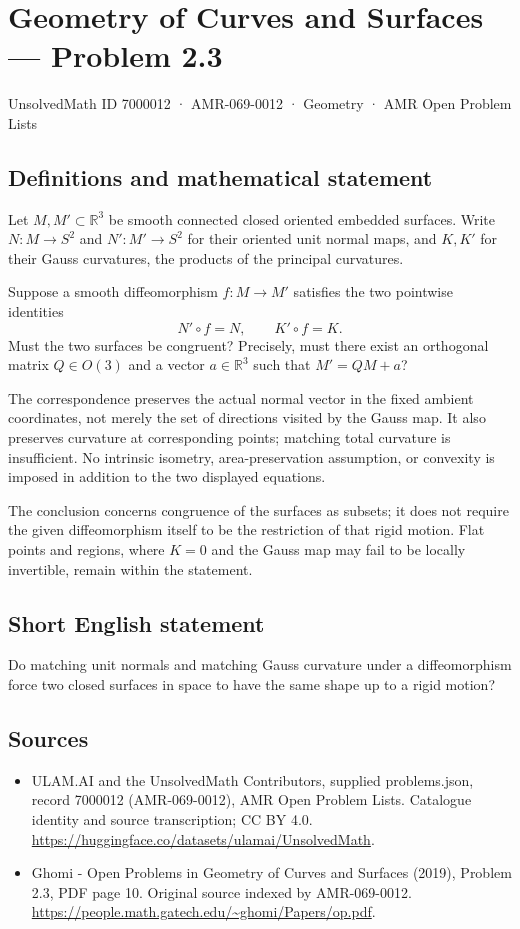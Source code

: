 \documentclass[11pt,a4paper]{article}
\begin{document}
\section*{Geometry of Curves and Surfaces — Problem 2.3}\label{7000012}
{\small UnsolvedMath ID 7000012 · AMR-069-0012 · Geometry · AMR Open Problem Lists}
\subsection{Definitions and mathematical statement}
Let $M,M'\subset\mathbb R^3$ be smooth connected closed oriented
embedded surfaces. Write $N:M\to S^2$ and $N':M'\to S^2$ for
their oriented unit normal maps, and $K,K'$ for their Gauss
curvatures, the products of the principal curvatures.

Suppose a smooth diffeomorphism $f:M\to M'$ satisfies the two
pointwise identities
\[
                         N'\circ f=N,\qquad K'\circ f=K.
\]
Must the two surfaces be congruent? Precisely, must there exist
an orthogonal matrix $Q\in O(3)$ and a vector $a\in\mathbb R^3$
such that $M'=QM+a$?

The correspondence preserves the actual normal vector in the
fixed ambient coordinates, not merely the set of directions
visited by the Gauss map. It also preserves curvature at
corresponding points; matching total curvature is insufficient.
No intrinsic isometry, area-preservation assumption, or convexity
is imposed in addition to the two displayed equations.

The conclusion concerns congruence of the surfaces as subsets;
it does not require the given diffeomorphism itself to be the
restriction of that rigid motion. Flat points and regions, where
$K=0$ and the Gauss map may fail to be locally invertible, remain
within the statement.
\subsection{Short English statement}
Do matching unit normals and matching Gauss curvature under a
diffeomorphism force two closed surfaces in space to have the
same shape up to a rigid motion?
\subsection{Sources}
\begin{itemize}
\item[S1] ULAM.AI and the UnsolvedMath Contributors, supplied problems.json, record 7000012 (AMR-069-0012), AMR Open Problem Lists. Catalogue identity and source transcription; CC BY 4.0.
\url{https://huggingface.co/datasets/ulamai/UnsolvedMath}.
\item[S2] Ghomi - Open Problems in Geometry of Curves and Surfaces (2019), Problem 2.3, PDF page 10. Original source indexed by AMR-069-0012.
\url{https://people.math.gatech.edu/~ghomi/Papers/op.pdf}.
\end{itemize}
\end{document}

